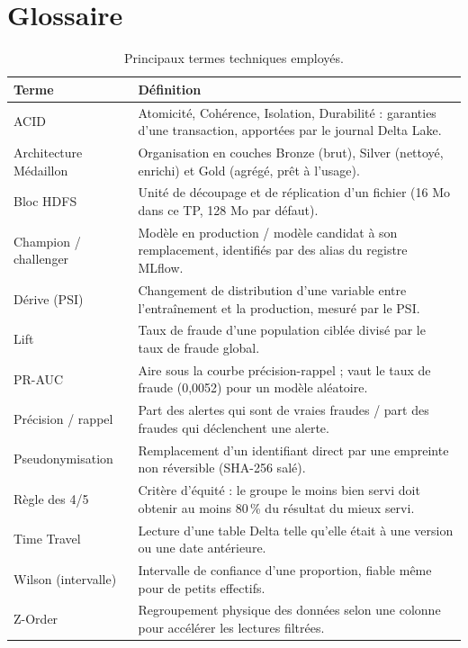 \documentclass[11pt,a4paper]{article}
\begin{document}
\section{Glossaire}
\begin{table}[H]
\centering\small
\begin{tabularx}{\linewidth}{@{}l Y@{}}
\toprule
\textbf{Terme} & \textbf{Définition} \\ \midrule
ACID & Atomicité, Cohérence, Isolation, Durabilité : garanties d'une transaction, apportées par le journal Delta Lake. \\
Architecture Médaillon & Organisation en couches Bronze (brut), Silver (nettoyé, enrichi) et Gold (agrégé, prêt à l'usage). \\
Bloc HDFS & Unité de découpage et de réplication d'un fichier (16 Mo dans ce TP, 128 Mo par défaut). \\
Champion / challenger & Modèle en production / modèle candidat à son remplacement, identifiés par des alias du registre MLflow. \\
Dérive (PSI) & Changement de distribution d'une variable entre l'entraînement et la production, mesuré par le PSI. \\
Lift & Taux de fraude d'une population ciblée divisé par le taux de fraude global. \\
PR-AUC & Aire sous la courbe précision-rappel ; vaut le taux de fraude (0,0052) pour un modèle aléatoire. \\
Précision / rappel & Part des alertes qui sont de vraies fraudes / part des fraudes qui déclenchent une alerte. \\
Pseudonymisation & Remplacement d'un identifiant direct par une empreinte non réversible (SHA-256 salé). \\
Règle des 4/5 & Critère d'équité : le groupe le moins bien servi doit obtenir au moins 80\,\% du résultat du mieux servi. \\
Time Travel & Lecture d'une table Delta telle qu'elle était à une version ou une date antérieure. \\
Wilson (intervalle) & Intervalle de confiance d'une proportion, fiable même pour de petits effectifs. \\
Z-Order & Regroupement physique des données selon une colonne pour accélérer les lectures filtrées. \\
\bottomrule
\end{tabularx}
\caption{Principaux termes techniques employés.}
\end{table}
\end{document}
